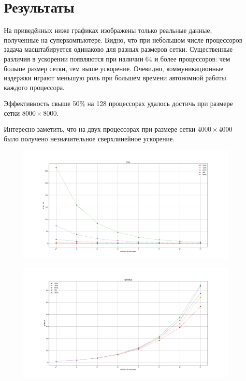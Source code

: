 \documentclass[14pt]{extarticle}
\begin{document}
\section{Результаты}
На приведённых ниже графиках изображены только реальные данные, полученные на суперкомпьютере. Видно, что при небольшом числе процессоров задача масштабируется одинаково для разных размеров сетки. Существенные различия в ускорении появляются при наличии 64 и более процессоров: чем больше размер сетки, тем выше ускорение. Очевидно, коммуникационные издержки играют меньшую роль при большем времени автономной работы каждого процессора.

Эффективность свыше 50\% на 128 процессорах удалось достичь при размере сетки $8000 \times 8000$. 

Интересно заметить, что на двух процессорах при размере сетки $4000 \times 4000$ было получено незначительное сверхлинейное ускорение.

\begin{figure}[H]
	\centering
	\includegraphics[scale=0.4]{time}
\end{figure}

\begin{figure}[H]
	\centering
	\includegraphics[scale=0.4]{speedup}
\end{figure}
\end{document}
